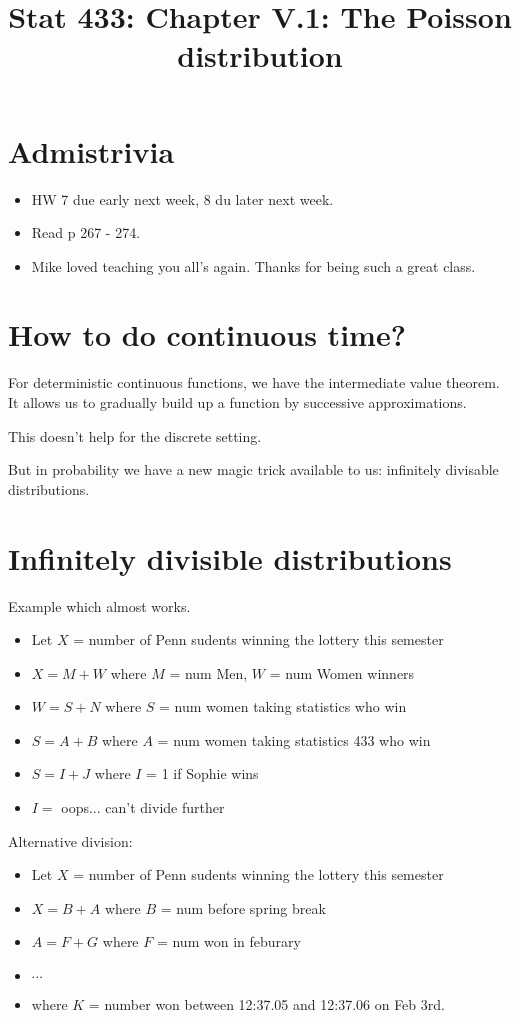 \documentclass[20pt]{extarticle}
\begin{document}
\title{Stat 433: Chapter V.1: The Poisson distribution}

\section{Admistrivia}
\begin{itemize}
\item  HW 7 due early next week, 8 du later next week.
\item Read p 267 - 274.
\item Mike loved teaching you all's again. Thanks for being such a
great class.
\end{itemize}

\newpage

\section{How to do continuous time?}

For deterministic continuous functions, we have the intermediate value
 theorem.  It allows us to gradually build up a function by successive
approximations. 

This doesn't help for the discrete setting.

But in probability we have a new magic trick available to us:
 \cite{http://en.wikipedia.org/wiki/Infinite_divisibility_(probability)}{infinitely
 divisable distributions.}

\section{Infinitely divisible distributions}

Example which almost works.
\begin{itemize}
\item Let $X$ = number of Penn sudents winning the lottery this semester
\item $X = M+W$ where $M$ = num Men, $W$ = num Women winners
\item $W = S+N$ where $S$ = num women taking statistics who win
\item $S = A + B$ where $A$ = num women taking statistics 433 who win
\item $S = I + J$ where $I$ = 1 if Sophie wins
\item $I = $ oops... can't divide further
\end{itemize}

\newpage

Alternative division:
\begin{itemize}
\item Let $X$ = number of Penn sudents winning the lottery this semester
\item $X = B+A$ where $B$ = num before spring break
\item $A = F+G$ where $F$ = num won in feburary
\item $\cdots$
\item where $K$ = number won between 12:37.05 and 12:37.06 on Feb 3rd.
\end{itemize}
\newpage
\end{document}
